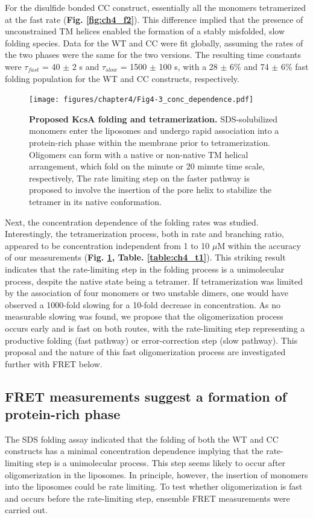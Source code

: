For the disulfide bonded CC construct, essentially all the monomers tetramerized at the fast rate (\textbf{Fig. \ref{fig:ch4_f2}}). This difference implied that the presence of unconstrained TM helices enabled the formation of a stably misfolded, slow folding species. Data for the WT and CC were fit globally, assuming the rates of the two phases were the same for the two versions. The resulting time constants were $\tau_{fast}$ = 40 $\pm$ 2 s and $\tau_{slow}$ = 1500 $\pm$ 100 s, with a 28 $\pm$ 6\% and 74 $\pm$ 6\% fast folding population for the WT and CC constructs, respectively.

\begin{figure}[!ht]
\begin{center}
	\texttt{[image: figures/chapter4/Fig4-3\_conc\_dependence.pdf]}
\end{center}
	\caption{\textbf{Proposed KcsA folding and tetramerization.} SDS-solubilized monomers enter the liposomes and undergo rapid association into a protein-rich phase within the membrane prior to tetramerization. Oligomers can form with a native or non-native TM helical arrangement, which fold on the minute or 20 minute time scale, respectively, The rate limiting step on the faster pathway is proposed to involve the insertion of the pore helix to stabilize the tetramer in its native conformation.}
	\label{fig:ch4_f3}
\end{figure}

Next, the concentration dependence of the folding rates was studied. Interestingly, the tetramerization process, both in rate and branching ratio, appeared to be concentration independent from 1 to 10 $\mu$M within the accuracy of our measurements (\textbf{Fig. \ref{fig:ch4_f3}, Table. \ref{table:ch4_t1}}). This striking result indicates that the rate-limiting step in the folding process is a unimolecular process, despite the native state being a tetramer. If tetramerization was limited by the association of four monomers or two unstable dimers, one would have observed a 1000-fold slowing for a 10-fold decrease in concentration. As no measurable slowing was found, we propose that the oligomerization process occurs early and is fast on both routes, with the rate-limiting step representing a productive folding (fast pathway) or error-correction step (slow pathway). This proposal and the nature of this fast oligomerization process are investigated further with FRET below.

\subsection{FRET measurements suggest a formation of protein-rich phase}
The SDS folding assay indicated that the folding of both the WT and CC constructs has a minimal concentration dependence implying that the rate-limiting step is a unimolecular process. This step seems likely to occur after oligomerization in the liposomes. In principle, however, the insertion of monomers into the liposomes could be rate limiting. To test whether oligomerization is fast and occurs before the rate-limiting step, ensemble FRET measurements were carried out.


